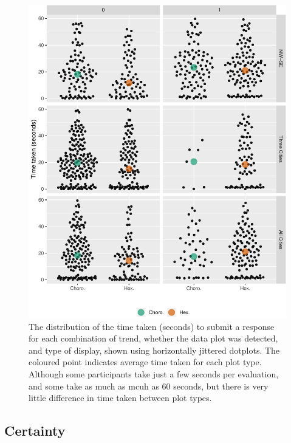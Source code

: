 \documentclass[conference,final,]{IEEEtran}
\makeatletter
\def\maxwidth{\ifdim\Gin@nat@width>\linewidth\linewidth
\else\Gin@nat@width\fi}
\let\Oldincludegraphics\includegraphics
\renewcommand{\includegraphics}[1]{\Oldincludegraphics[width=\maxwidth]{#1}}
\makeatother
\begin{document}
\begin{figure}
\centering
\includegraphics{paper_files/figure-latex/beeswarm-1.pdf}
\caption{The distribution of the time taken (seconds) to submit a
response for each combination of trend, whether the data plot was
detected, and type of display, shown using horizontally jittered
dotplots. The coloured point indicates average time taken for each plot
type. Although some participants take just a few seconds per evaluation,
and some take as much as mcuh as 60 seconds, but there is very little
difference in time taken between plot types.}
\end{figure}

\hypertarget{certainty}{%
\subsection{Certainty}\label{certainty}}
\end{document}
